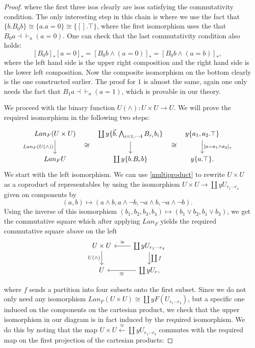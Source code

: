 \documentclass[a4paper]{amsproc}
\theoremstyle{plain}
\theoremstyle{definition}
\theoremstyle{remark}
\numberwithin{equation}{section}
\begin{document}
\begin{proof}
where the first three isos clearly are isos satisfying the commutativity condition. The only interesting step in this chain is where we use the fact that $\{b . B_0 b\} \cong \{a . a = 0\} \cong \{[]. \top\}$, where the first isomorphism uses the that $B_0 a \dashv \vdash_a (a = 0)$. One can check that the last commutativity condition also holds:
\[
[B_0 b]_* [a=0]_* = [B_0 b \wedge (a = 0)]_* = [B_0 b \wedge (a=b)]_*,
\]
where the left hand side is the upper right composition and the right hand side is the lower left composition. Now the composite isomorphism on the bottom clearly is the one constructed earlier. The proof for $1$ is almost the same, again one only needs the fact that $B_1 a \dashv \vdash_a (a = 1)$, which is provable in our theory.

We proceed with the binary function $U(\wedge): U \times U \to U$. We will prove the required isomorphism in the following two steps:
\[
\begin{tikzcd}
Lan_F(U \times U) \arrow[d, "Lan_F(U(\wedge))"'] \arrow[r, phantom, shift right=7, "\cong"] & {\coprod y \{\vec{b}.\bigwedge_{i=1,\cdots 4} B_{r_i} b_i\}} \arrow[d] \arrow[r, phantom, shift right=7, "\cong"] & {y \{a_1,a_2.\top\}} \arrow[d, "{[a = a_1 \wedge a_2]_*}"] \\
Lan_F U                                          & \coprod y \{b.B_rb\} & y\{a.\top\} .
\end{tikzcd}
\]
We start with the left isomorphism. We can use \ref{multiproduct} to rewrite $U \times U$ as a coproduct of representables by using the isomorphism $U \times U \to \coprod y U_{r_1 \cdots r_4}$ given on components by 
\[
(a,b) \mapsto (a \wedge b, a \wedge \neg b, \neg a \wedge b, \neg a \wedge \neg b) .
\]
Using the inverse of this isomorphism $(b_1,b_2,b_3,b_4) \mapsto (b_1 \vee b_2, b_1 \vee b_3)$, we get the commutative square which after applying $Lan_F$ yields the required commutative square above on the left
\[
\begin{tikzcd}
U \times U \arrow[d, "U(\wedge)"'] & \coprod y U_{r_1 \cdots r_4} \arrow[d, "\coprod f"] \arrow[l, "\cong"'] \\
U                                  & \coprod y U_r \arrow[l, "\cong"]                          ,
\end{tikzcd}
\]

where $f$ sends a partition into four subsets onto the first subset. Since we do not only need any isomorphism $Lan_F (U \times U) \cong \coprod y F (U_{r_1 \cdots r_4})$, but a specific one induced on the components on the cartesian product, we check that the upper isomorphism in our diagram is in fact induced by the required isomorphism. We do this by noting that the map $U \times U \xleftarrow{\cong} \coprod y U_{r_1 \cdots r_4}$ commutes with the required map on the first projection of the cartesian products:


\end{proof}
\end{document}
